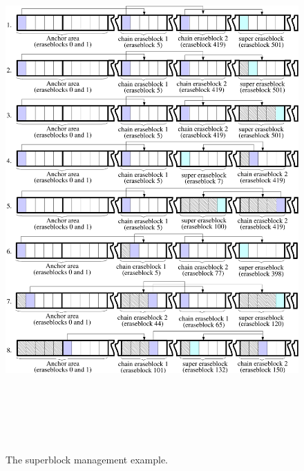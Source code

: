 \documentclass[12pt,a4paper,oneside,titlepage]{article}
\begin{document}
\begin{figure}[!t]
\begin{center}
\includegraphics[width=159mm,height=200mm]{pics/sb-02.pdf}
\end{center}
\caption{The superblock management example.}
\label{ref_FigureSB_02}
\end{figure}
\end{document}
